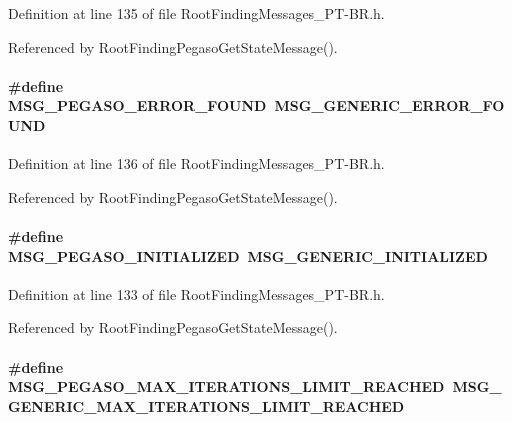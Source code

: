 Definition at line 135 of file RootFindingMessages\_\-PT-BR.h.

Referenced by RootFindingPegasoGetStateMessage().\hypertarget{group____messages_g7dea968f607ba6d45ced25ab97a9030c}{
\paragraph[MSG\_\-PEGASO\_\-ERROR\_\-FOUND]{\setlength{\rightskip}{0pt plus 5cm}\#define MSG\_\-PEGASO\_\-ERROR\_\-FOUND~MSG\_\-GENERIC\_\-ERROR\_\-FOUND}\hfill}
\label{group____messages_g7dea968f607ba6d45ced25ab97a9030c}




Definition at line 136 of file RootFindingMessages\_\-PT-BR.h.

Referenced by RootFindingPegasoGetStateMessage().\hypertarget{group____messages_g1f0c0e6ae1166d8ebb0e48216dbd2c8b}{
\paragraph[MSG\_\-PEGASO\_\-INITIALIZED]{\setlength{\rightskip}{0pt plus 5cm}\#define MSG\_\-PEGASO\_\-INITIALIZED~MSG\_\-GENERIC\_\-INITIALIZED}\hfill}
\label{group____messages_g1f0c0e6ae1166d8ebb0e48216dbd2c8b}




Definition at line 133 of file RootFindingMessages\_\-PT-BR.h.

Referenced by RootFindingPegasoGetStateMessage().\hypertarget{group____messages_g7559f15f358baf95e22bf7c7acea5fa1}{
\paragraph[MSG\_\-PEGASO\_\-MAX\_\-ITERATIONS\_\-LIMIT\_\-REACHED]{\setlength{\rightskip}{0pt plus 5cm}\#define MSG\_\-PEGASO\_\-MAX\_\-ITERATIONS\_\-LIMIT\_\-REACHED~MSG\_\-GENERIC\_\-MAX\_\-ITERATIONS\_\-LIMIT\_\-REACHED}\hfill}
\label{group____messages_g7559f15f358baf95e22bf7c7acea5fa1}




